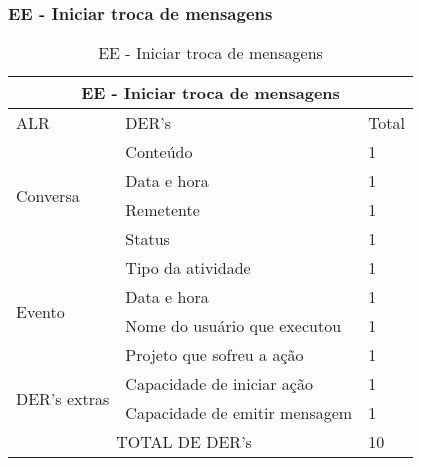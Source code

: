  \subsubsection{EE - Iniciar troca de mensagens}
\begin{table}[!h]
\centering
\caption{EE - Iniciar troca de mensagens}
\label{ee_iniciar_troca}
\begin{tabular}{|l|l|l|}
\hline
\multicolumn{3}{|c|}{EE - Iniciar troca de mensagens}                 \\ \hline
ALR                           & DER's                         & Total \\ \hline
\multirow{4}{*}{Conversa}     & Conteúdo                      & 1     \\ \cline{2-3} 
                              & Data e hora                   & 1     \\ \cline{2-3} 
                              & Remetente                     & 1     \\ \cline{2-3} 
                              & Status                        & 1     \\ \hline
\multirow{4}{*}{Evento}       & Tipo da atividade             & 1     \\ \cline{2-3} 
                              & Data e hora                   & 1     \\ \cline{2-3} 
                              & Nome do usuário que executou  & 1     \\ \cline{2-3} 
                              & Projeto que sofreu a ação     & 1     \\ \hline
\multirow{2}{*}{DER's extras} & Capacidade de iniciar ação    & 1     \\ \cline{2-3} 
                              & Capacidade de emitir mensagem & 1     \\ \hline
\multicolumn{2}{|c|}{TOTAL DE DER's}                          & 10    \\ \hline
\end{tabular}
\end{table}
 
